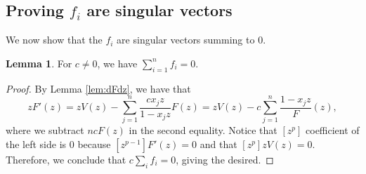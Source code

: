 \documentclass{elsarticle}
\numberwithin{equation}{section}
\theoremstyle{definition}
\newtheorem{lemma}[theorem]{Lemma}
\begin{document}
\subsection{Proving $f_i$ are singular vectors} 

We now show that the $f_i$ are singular vectors summing to $0$.

\begin{lemma} \label{lem:sum-zero}
For $c \neq 0$, we have $\sum_{i = 1}^n f_i = 0$.
\end{lemma}
\begin{proof}
By Lemma \ref{lem:dFdz}, we have that
\[
zF'(z) = z V(z) - \sum_{j = 1}^n \frac{cx_jz}{1 - x_j z} F(z) = z V(z) - c \sum_{j = 1}^n \frac{1 - x_j z} F(z),
\]
where we subtract $ncF(z)$ in the second equality.  Notice that $[z^p]$ coefficient of the left side is $0$ because $[z^{p - 1}] F'(z) = 0$ and that $[z^p] zV(z) = 0$.  Therefore, we conclude that $c \sum_i f_i = 0$, giving the desired.
\end{proof}
\end{document}
